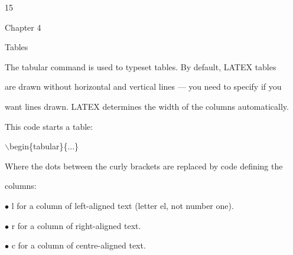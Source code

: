 \documentclass[a4paper,portrait,12pt]{article}
\begin{document}
15










\begin{flushleft}
\newpage
Chapter 4
\end{flushleft}


\begin{flushleft}
Tables
\end{flushleft}


\begin{flushleft}
The tabular command is used to typeset tables. By default, LATEX tables
\end{flushleft}


\begin{flushleft}
are drawn without horizontal and vertical lines --- you need to specify if you
\end{flushleft}


\begin{flushleft}
want lines drawn. LATEX determines the width of the columns automatically.
\end{flushleft}


\begin{flushleft}
This code starts a table:
\end{flushleft}


\begin{flushleft}
\ensuremath{\backslash}begin\{tabular\}\{...\}
\end{flushleft}


\begin{flushleft}
Where the dots between the curly brackets are replaced by code defining the
\end{flushleft}


\begin{flushleft}
columns:
\end{flushleft}


\begin{flushleft}
$\bullet$ l for a column of left-aligned text (letter el, not number one).
\end{flushleft}


\begin{flushleft}
$\bullet$ r for a column of right-aligned text.
\end{flushleft}


\begin{flushleft}
$\bullet$ c for a column of centre-aligned text.
\end{flushleft}
\end{document}
